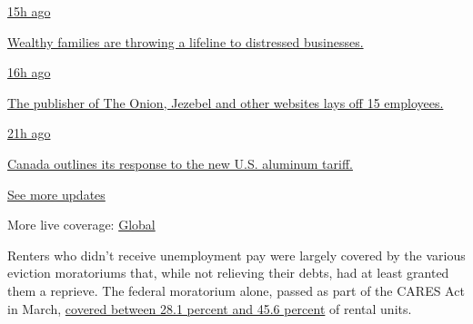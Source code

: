 \href{https://www.nytimes.com/live/2020/08/07/business/stock-market-today-coronavirus?action=click\&pgtype=Article\&state=default\&region=MAIN_CONTENT_1\&context=storylines_live_updates\#wealthy-families-are-throwing-a-lifeline-to-distressed-businesses}{15h
ago}

\href{https://www.nytimes.com/live/2020/08/07/business/stock-market-today-coronavirus?action=click\&pgtype=Article\&state=default\&region=MAIN_CONTENT_1\&context=storylines_live_updates\#wealthy-families-are-throwing-a-lifeline-to-distressed-businesses}{Wealthy
families are throwing a lifeline to distressed businesses.}

\href{https://www.nytimes.com/live/2020/08/07/business/stock-market-today-coronavirus?action=click\&pgtype=Article\&state=default\&region=MAIN_CONTENT_1\&context=storylines_live_updates\#the-publisher-of-the-onion-jezebel-and-other-websites-lays-off-15-employees}{16h
ago}

\href{https://www.nytimes.com/live/2020/08/07/business/stock-market-today-coronavirus?action=click\&pgtype=Article\&state=default\&region=MAIN_CONTENT_1\&context=storylines_live_updates\#the-publisher-of-the-onion-jezebel-and-other-websites-lays-off-15-employees}{The
publisher of The Onion, Jezebel and other websites lays off 15
employees.}

\href{https://www.nytimes.com/live/2020/08/07/business/stock-market-today-coronavirus?action=click\&pgtype=Article\&state=default\&region=MAIN_CONTENT_1\&context=storylines_live_updates\#canada-outlines-its-response-to-the-new-us-aluminum-tariff}{21h
ago}

\href{https://www.nytimes.com/live/2020/08/07/business/stock-market-today-coronavirus?action=click\&pgtype=Article\&state=default\&region=MAIN_CONTENT_1\&context=storylines_live_updates\#canada-outlines-its-response-to-the-new-us-aluminum-tariff}{Canada
outlines its response to the new U.S. aluminum tariff.}

\href{https://www.nytimes.com/live/2020/08/07/business/stock-market-today-coronavirus?action=click\&pgtype=Article\&state=default\&region=MAIN_CONTENT_1\&context=storylines_live_updates}{See
more updates}

More live coverage:
\href{https://www.nytimes.com/2020/08/07/world/covid-19-news.html?action=click\&pgtype=Article\&state=default\&region=MAIN_CONTENT_1\&context=storylines_live_updates}{Global}

Renters who didn't receive unemployment pay were largely covered by the
various eviction moratoriums that, while not relieving their debts, had
at least granted them a reprieve. The federal moratorium alone, passed
as part of the CARES Act in March,
\href{https://www.frbatlanta.org/community-development/publications/partners-update/2020/covid-19-publications/200616-housing-policy-impact-federal-eviction-protection-coverage-and-the-need-for-better-data.aspx}{covered
between 28.1 percent and 45.6 percent} of rental units.

